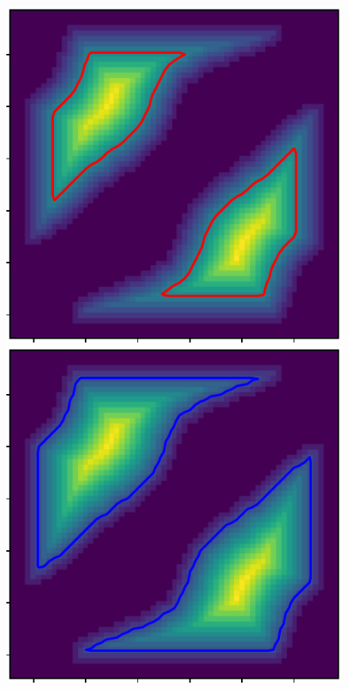 \begin{figure}[htbp]
\centering
    \includegraphics[scale=1.]{figures/hsn_as1_1.pdf}
    \includegraphics[scale=1.]{figures/hsn_as1_2.pdf}
    \caption{}
    \label{fig:hsn_as1}
\end{figure}

